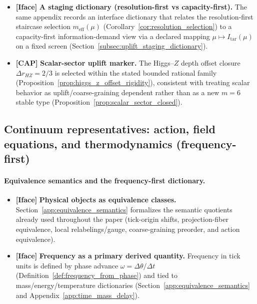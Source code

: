 \begin{itemize}
Appendix~\ref{app:resolution_uplift_fusion_horizon_unification} records a feasibility-first CAP key for selecting $(m,n)$ from a finite constrained family to meet a target information demand $I_{\mathrm{tar}}$ (bits), together with deterministic monotonicity and threshold-staging statements (Lemmas~\ref{lem:uplift_cap_unique}--\ref{lem:uplift_monotone_in_Itar} and Proposition~\ref{prop:n_blocked_implies_m_expand}).
\item \textbf{[Iface]} \textbf{A staging dictionary (resolution-first vs capacity-first).}
The same appendix records an interface dictionary that relates the resolution-first staircase selection $m_{\mathrm{eff}}(\mu)$ (Corollary~\ref{cor:resolution_selection}) to a capacity-first information-demand view via a declared mapping $\mu\mapsto I_{\mathrm{tar}}(\mu)$ on a fixed screen (Section~\ref{subsec:uplift_staging_dictionary}).
\item \textbf{[CAP]} \textbf{Scalar-sector uplift marker.}
The Higgs--$Z$ depth offset closure $\Delta r_{HZ}=2/3$ is selected within the stated bounded rational family (Proposition~\ref{prop:higgs_z_offset_rigidity}), consistent with treating scalar behavior as uplift/coarse-graining dependent rather than as a new $m=6$ stable type (Proposition~\ref{prop:scalar_sector_closed}).
\end{itemize}

\subsection{Continuum representatives: action, field equations, and thermodynamics (frequency-first)}
\label{subsec:ledger_continuum_representatives}

\paragraph{Equivalence semantics and the frequency-first dictionary.}
\begin{itemize}
\item \textbf{[Iface]} \textbf{Physical objects as equivalence classes.}
Section~\ref{app:equivalence_semantics} formalizes the semantic quotients already used throughout the paper (tick-origin shifts, projection-fiber equivalence, local relabelings/gauge, coarse-graining preorder, and action equivalence).
\item \textbf{[Iface]} \textbf{Frequency as a primary derived quantity.}
Frequency in tick units is defined by phase advance $\omega=\Delta\theta/\Delta t$ (Definition~\ref{def:frequency_from_phase}) and tied to mass/energy/temperature dictionaries (Section~\ref{app:equivalence_semantics} and Appendix~\ref{app:time_mass_delay}).
\end{itemize}

